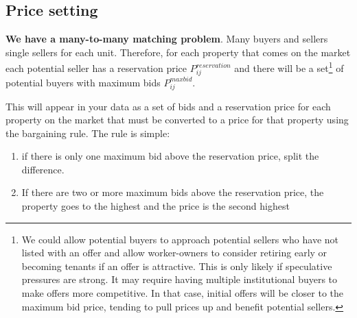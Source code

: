 \subsection{Price setting}
\textbf{We have a many-to-many matching problem}. Many buyers and sellers single sellers for each unit. Therefore, for each property that comes on the market each potential seller has a reservation price $P_{ij}^{reservation}$ and there will be a set\footnote{We could allow potential buyers  to approach potential sellers who have not listed with an offer and allow worker-owners to consider retiring early or becoming tenants if an offer is attractive.  This is only likely if speculative pressures are strong. It may require having multiple institutional buyers to make offers more competitive. In that case, initial offers will be closer to the maximum bid price, tending to pull prices up and benefit potential sellers.}  of potential buyers with maximum bids $P_{ij}^{maxbid}$.


This will appear in your data as a set of bids and a reservation price for each property on the market that must be converted to a price for that property using the bargaining rule. The rule is simple: 
\begin{enumerate}
    \item if there is only one maximum bid above the reservation price, split the difference.

    \item If there are two or more maximum bids above the reservation price, the property goes to the highest  and the price is the second highest
\end{enumerate}

